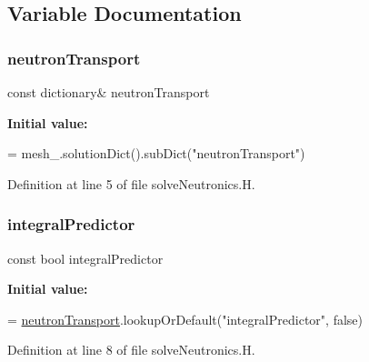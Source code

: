 \subsection{Variable Documentation}
\mbox{\label{solveNeutronics_8H_ac82f3800c6fe7f00c65fbf04d3c1050d}} 
\subsubsection{\texorpdfstring{neutron\+Transport}{neutronTransport}}
{\footnotesize\ttfamily const dictionary\& neutron\+Transport}

{\bfseries Initial value\+:}
\begin{DoxyCode}
=
    mesh\_.solutionDict().subDict(\textcolor{stringliteral}{"neutronTransport"})
\end{DoxyCode}


Definition at line 5 of file solve\+Neutronics.\+H.

\mbox{\label{solveNeutronics_8H_a47288f41defba643691d6ea37cc5cf2c}} 
\subsubsection{\texorpdfstring{integral\+Predictor}{integralPredictor}}
{\footnotesize\ttfamily const bool integral\+Predictor}

{\bfseries Initial value\+:}
\begin{DoxyCode}
=
    \hyperlink{solveNeutronics_8H_ac82f3800c6fe7f00c65fbf04d3c1050d}{neutronTransport}.lookupOrDefault(\textcolor{stringliteral}{"integralPredictor"}, \textcolor{keyword}{false})
\end{DoxyCode}


Definition at line 8 of file solve\+Neutronics.\+H.

\mbox{\label{solveNeutronics_8H_a46db48a7bd00bc40295bd4cf91143649}} 
